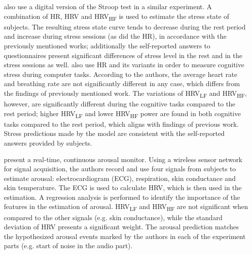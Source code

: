 \textcite{bousefsaf2013remote} also use a digital version of the Stroop test in a similar experiment. A combination of HR, HRV and HRV\textsubscript{HF} is used to estimate the stress state of subjects. The resulting stress state curve tends to decrease during the rest period and increase during stress sessions (as did the HR), in accordance with the previously mentioned works; additionally the self-reported answers to questionnaires present significant differences of stress level in the rest and in the stress sessions as well. \textcite{mcduff2014remote,mcduffcogcam} also use HR and its variants in order to measure cognitive stress during computer tasks. According to the authors, the average heart rate and breathing rate are not significantly different in any case, which differs from the findings of previously mentioned work. The variations of HRV\textsubscript{LF} and HRV\textsubscript{HF}, however, are significantly different during the cognitive tasks compared to the rest period; higher HRV\textsubscript{LF} and lower HRV\textsubscript{HF} power are found in both cognitive tasks compared to the rest period, which aligns with findings of previous work. Stress predictions made by the model are consistent with the self-reported answers provided by subjects.

\textcite{grundlehner2009design} present a real-time, continuous arousal monitor. Using a wireless sensor network for signal acquisition, the authors record and use four signals from subjects to estimate arousal: electrocardiogram (ECG), respiration, skin conductance and skin temperature. The ECG is used to calculate HRV, which is then used in the estimation. A regression analysis is performed to identify the importance of the features in the estimation of arousal. HRV\textsubscript{LF} and HRV\textsubscript{HF} are not significant when compared to the other signals (e.g. skin conductance), while the standard deviation of HRV presents a significant weight. The arousal prediction matches the hypothesized arousal events marked by the authors in each of the experiment parts (e.g. start of noise in the audio part).


